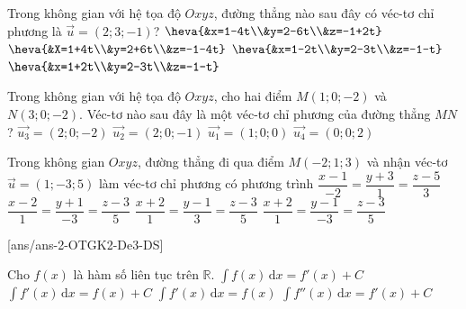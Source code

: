 \begin{ex}%
	Trong không gian với hệ tọa độ $Oxyz$, đường thẳng nào sau đây có véc-tơ chỉ phương là $\overrightarrow{u}=(2;3;-1)$?
	\choice
	{\True $\heva{&x=1-4t\\&y=2-6t\\&z=-1+2t}$}
	{$\heva{&X=1+4t\\&y=2+6t\\&z=-1-4t}$}
	{$\heva{&x=1-2t\\&y=2-3t\\&z=-1-t}$}
	{$\heva{&x=1+2t\\&y=2-3t\\&z=-1-t}$}
\end{ex}

\begin{ex}%
	Trong không gian với hệ tọa độ $Oxyz$, cho hai điểm $M(1;0;-2)$ và $N(3;0;-2)$. Véc-tơ nào sau đây là một véc-tơ chỉ phương của đường thẳng $MN$?
	\choice
	{$\vec{u_3}=(2;0;-2)$}
	{$\vec{u_2}=(2;0;-1)$}
	{\True $\vec{u_1}=(1;0;0)$}
	{$\vec{u_4}=(0;0;2)$}
\end{ex}

\begin{ex}%
	Trong không gian $Oxyz$, đường thẳng đi qua điểm $M(-2;1;3)$ và nhận véc-tơ $\overrightarrow{u}=(1;-3;5)$ làm véc-tơ chỉ phương có phương trình
	\choice
	{$\dfrac{x-1}{-2}=\dfrac{y+3}{1}=\dfrac{z-5}{3}$}
	{$\dfrac{x-2}{1}=\dfrac{y+1}{-3}=\dfrac{z-3}{5}$}
	{$\dfrac{x+2}{1}=\dfrac{y-1}{3}=\dfrac{z-3}{5}$}
	{\True $\dfrac{x+2}{1}=\dfrac{y-1}{-3}=\dfrac{z-3}{5}$}
\end{ex}

\cauds
{}[ans/ans-2-OTGK2-De3-DS]
\begin{ex}
	Cho $f(x)$ là hàm số liên tục trên $\mathbb{R}$.
	\choiceTF
	{$\displaystyle \int f(x) \mathrm{\,d} x=f'(x)+C$}
	{\True $\displaystyle \int f'(x) \mathrm{\,d} x=f(x)+C$}
	{$\displaystyle \int f'(x) \mathrm{\,d} x=f(x)$}
	{\True $\displaystyle \int f''(x) \mathrm{\,d} x=f'(x)+C$}
\end{ex}

